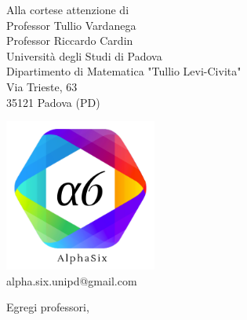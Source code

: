 \documentclass[12pt]{letter} %
\begin{document}

		
	\begin{letter}{%
		Alla cortese attenzione di
		\\Professor Tullio Vardanega
		\\Professor Riccardo Cardin
		\vspace{0.7em}
		\\Università degli Studi di Padova
		\\Dipartimento di Matematica "Tullio Levi-Civita"
		\\Via Trieste, 63
		\\35121 Padova (PD)
	} %

	\begin{center}
		\includegraphics[width=5cm]{../template/icons/a6.png}
		\\ alpha.six.unipd@gmail.com
	\end{center}

	\opening{%
		Egregi professori,
	}


\end{letter}
\end{document}
